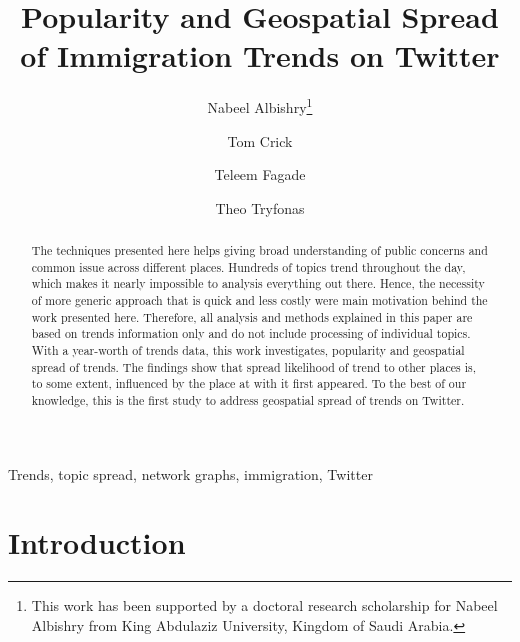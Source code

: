 \documentclass{llncs}
\begin{document}
\title{Popularity and
  Geospatial Spread of Immigration Trends on Twitter}

\author{Nabeel Albishry\thanks{This work has been supported by a doctoral research scholarship for
Nabeel Albishry from King Abdulaziz University, Kingdom of Saudi
Arabia.} \and Tom
  Crick \and Teleem Fagade \and Theo Tryfonas}


\maketitle

\begin{abstract}
The techniques presented here helps giving broad understanding of
public concerns and common issue across different places. Hundreds of
topics trend throughout the day, which makes it nearly impossible to
analysis everything out there. Hence, the necessity of more generic
approach that is quick and less costly were main motivation behind the
work presented here. Therefore, all analysis and methods explained in
this paper are based on trends information only and do not include
processing of individual topics. With a year-worth of trends data,
this work investigates, popularity and geospatial spread of
trends. The findings show that spread likelihood of trend to other
places is, to some extent, influenced by the place at with it first
appeared. To the best of our knowledge, this is the first study to
address geospatial spread of trends on Twitter.
 \end{abstract}

\begin{keywords}
Trends, topic spread, network graphs, immigration, Twitter
\end{keywords}

\section{Introduction}\label{intro}
\end{document}
